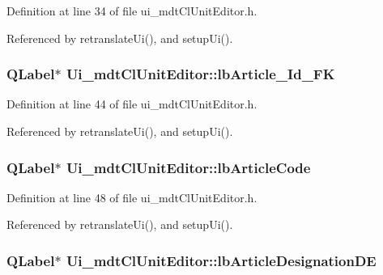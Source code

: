 Definition at line 34 of file ui\-\_\-mdt\-Cl\-Unit\-Editor.\-h.



Referenced by retranslate\-Ui(), and setup\-Ui().

\hypertarget{class_ui__mdt_cl_unit_editor_abe071a9759646c58a0946d2a405ef979}{
\subsubsection[{lb\-Article\-\_\-\-Id\-\_\-\-F\-K}]{\setlength{\rightskip}{0pt plus 5cm}Q\-Label$\ast$ Ui\-\_\-mdt\-Cl\-Unit\-Editor\-::lb\-Article\-\_\-\-Id\-\_\-\-F\-K}}\label{class_ui__mdt_cl_unit_editor_abe071a9759646c58a0946d2a405ef979}


Definition at line 44 of file ui\-\_\-mdt\-Cl\-Unit\-Editor.\-h.



Referenced by retranslate\-Ui(), and setup\-Ui().

\hypertarget{class_ui__mdt_cl_unit_editor_a3922f25a88fb5976e9735ad610bb9967}{
\subsubsection[{lb\-Article\-Code}]{\setlength{\rightskip}{0pt plus 5cm}Q\-Label$\ast$ Ui\-\_\-mdt\-Cl\-Unit\-Editor\-::lb\-Article\-Code}}\label{class_ui__mdt_cl_unit_editor_a3922f25a88fb5976e9735ad610bb9967}


Definition at line 48 of file ui\-\_\-mdt\-Cl\-Unit\-Editor.\-h.



Referenced by retranslate\-Ui(), and setup\-Ui().

\hypertarget{class_ui__mdt_cl_unit_editor_ae56ed6426b5f05b1958b0a95e4db1bf3}{
\subsubsection[{lb\-Article\-Designation\-D\-E}]{\setlength{\rightskip}{0pt plus 5cm}Q\-Label$\ast$ Ui\-\_\-mdt\-Cl\-Unit\-Editor\-::lb\-Article\-Designation\-D\-E}}\label{class_ui__mdt_cl_unit_editor_ae56ed6426b5f05b1958b0a95e4db1bf3}


